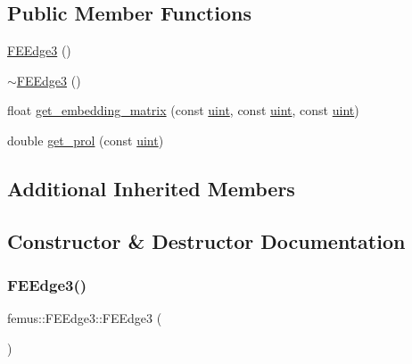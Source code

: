 \subsection*{Public Member Functions}
\begin{DoxyCompactItemize}
\item 
\mbox{\hyperlink{classfemus_1_1_f_e_edge3_a5b6ca9bbadc443999ed736956a5c3ea5}{F\+E\+Edge3}} ()
\item 
\mbox{\hyperlink{classfemus_1_1_f_e_edge3_a704bd8b302fa2246b09ca40ddaa37190}{$\sim$\+F\+E\+Edge3}} ()
\item 
float \mbox{\hyperlink{classfemus_1_1_f_e_edge3_a89085312a08628bcff678c347c0a82e4}{get\+\_\+embedding\+\_\+matrix}} (const \mbox{\hyperlink{_typedefs_8hpp_a91ad9478d81a7aaf2593e8d9c3d06a14}{uint}}, const \mbox{\hyperlink{_typedefs_8hpp_a91ad9478d81a7aaf2593e8d9c3d06a14}{uint}}, const \mbox{\hyperlink{_typedefs_8hpp_a91ad9478d81a7aaf2593e8d9c3d06a14}{uint}})
\item 
double \mbox{\hyperlink{classfemus_1_1_f_e_edge3_a5ecf7d9b06c59a94e3f1da042afe2b71}{get\+\_\+prol}} (const \mbox{\hyperlink{_typedefs_8hpp_a91ad9478d81a7aaf2593e8d9c3d06a14}{uint}})
\end{DoxyCompactItemize}
\subsection*{Additional Inherited Members}


\subsection{Constructor \& Destructor Documentation}
\mbox{\label{classfemus_1_1_f_e_edge3_a5b6ca9bbadc443999ed736956a5c3ea5}} 
\subsubsection{\texorpdfstring{F\+E\+Edge3()}{FEEdge3()}}
{\footnotesize\ttfamily femus\+::\+F\+E\+Edge3\+::\+F\+E\+Edge3 (\begin{DoxyParamCaption}{ }\end{DoxyParamCaption})}

\mbox{\label{classfemus_1_1_f_e_edge3_a704bd8b302fa2246b09ca40ddaa37190}} 
